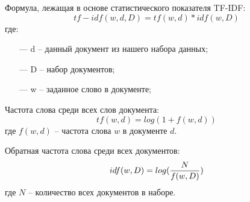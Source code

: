 Формула, лежащая в основе статистического показателя TF-IDF:
\begin{equation}\label{eq15}
    tf-idf(w, d, D) = tf(w, d) * idf(w, D)
\end{equation}
где:
\begin{itemize}
    \item[—] d -- данный документ из нашего набора данных;
    \item[—] D -- набор документов;
    \item[—] w -- заданное слово в документе;
\end{itemize}

Частота слова среди всех слов документа:
\begin{equation}\label{eq16}
    tf(w, d) = log(1 + f(w, d))
\end{equation}
где $f(w, d)$ -- частота слова $w$ в документе $d$.

Обратная частота слова среди всех документов:
\begin{equation}\label{eq17}
    idf(w, D) = log({{N}\over{f(w, D)}})
\end{equation}
где $N$ -- количество всех документов в наборе.
